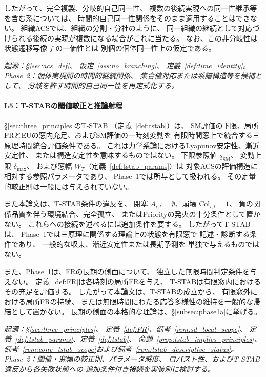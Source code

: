 したがって、完全複製、分岐的自己同一性、
複数の後続実現への同一性継承等を含む系については、
時間的自己同一性関係をそのまま適用することはできない。
組織ACSでは、組織の分割・分社のように、
同一組織の継続として対応づけられる後続の実現が複数になる場合がこれに当たる。
なお、この非分岐性は状態遷移写像 $f$ の一価性とは
別個の個体同一性上の仮定である。

\medskip
\noindent\textit{起源：\S\ref{sec:acs_def}、
仮定~\ref{ass:no_branching}、
定義~\ref{def:time_identity}。
Phase~2：個体実現間の時間的継続関係、
集合値対応または系譜構造等を候補として、
分岐を許す時間的自己同一性を再定式化する。}
\paragraph{L5：T-STABの閾値較正と推論射程}
\label{lim:L5}
\S\ref{sec:three_principles}のT-STAB
（定義~\ref{def:tstab}）は、
SM評価の下限、局所FRとEUの窓内充足、およびSM評価の一時刻変動を
有限時間窓上で統合する三原理時間統合評価条件である。
これは力学系論におけるLyapunov安定性、漸近安定性、
または構造安定性を意味するものではない。
下限参照値 $\underline{s}_{\mathrm{SM}}$、
変動上限 $\delta_{\max}$、
および窓幅 $W_T$（定義~\ref{def:tstab_params}）は
対象ACSの評価構造に相対する参照パラメータであり、
Phase~1では所与として扱われる。
その定量的較正則は一般には与えられていない。

また本論文は、T-STAB条件の違反を、
閉塞 $A_{i,t}=\emptyset$、崩壊 $\mathrm{Col}_{i,t}=1$、
負の関係品質を伴う環境結合、完全孤立、
またはPriorityの発火の十分条件として置かない。
これらへの接続を述べるには追加条件を要する。
したがってT-STABは、
Phase~1では三原理に関係する理論上の状態を有限窓で
記述・診断する条件であり、
一般的な収束、漸近安定性または長期予測を
単独で与えるものではない。

また、Phase~1は、FRの長期の側面について、
独立した無限時間判定条件を与えない。
定義~\ref{def:FR}は各時刻の局所FRを与え、
T-STABは有限窓内におけるその充足を評価する。
したがって本論文は、T-STABの成立から、
有限窓外における局所FRの持続、
または無限時間にわたる応答多様性の維持を一般的な帰結として置かない。
長期の側面の本格的な理論は、\S\ref{subsec:phase1a}に挙げる。

\medskip
\noindent\textit{起源：\S\ref{sec:three_principles}、
定義~\ref{def:FR}、備考~\ref{rem:sd_local_scope}、
定義~\ref{def:tstab_params}、定義~\ref{def:tstab}、
命題~\ref{prop:tstab_implies_principles}、
備考~\ref{rem:conv_tstab_scope}および備考~\ref{rem:tstab_descriptive_status}。
Phase~2：閾値・窓幅の較正則、パラメータ感度、
ロバスト性、およびT-STAB違反から各失敗状態への
追加条件付き接続を実装別に検討する。}

